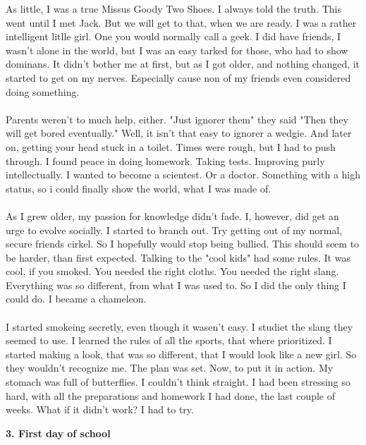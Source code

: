 \documentclass[]{article}
\begin{document}
As little, I was a true Missus Goody Two Shoes. I always told the truth. This went until I met Jack. But we will get to that, when we are ready. I was a rather intelligent litlle girl. One you would normally call a geek. I did have friends, I wasn't alone in the world, but I was an easy tarked for those, who had to show dominans. It didn't bother me at first, but as I got older, and nothing changed, it started to get on my nerves. Especially cause non of my friends even considered doing something.
\\ \\
Parents weren't to much help, either. "Just ignorer them" they said "Then they will get bored eventually." Well, it isn't that easy to ignorer a wedgie. And later on, getting your head stuck in a toilet. Times were rough, but I had to push through. I found peace in doing homework. Taking tests. Improving purly intellectually. I wanted to become a scientest. Or a doctor. Something with a high status, so i could finally show the world, what I was made of.
\\ \\
As I grew older, my passion for knowledge didn't fade. I, however, did get an urge to evolve socially. I started to branch out. Try getting out of my normal, secure friends cirkel. So I hopefully would stop being bullied. This should seem to be harder, than first expected. Talking to the "cool kids" had some rules. It was cool, if you smoked. You needed the right cloths. You needed the right slang. Everything was so different, from what I was used to. So I did the only thing I could do. I became a chameleon. 
\\ \\
I started smokeing secretly, even though it wasen't easy. I studiet the slang they seemed to use. I learned the rules of all the sports, that where prioritized. I started making a look, that was so different, that I would look like a new girl. So they wouldn't recognize me. The plan was set. Now, to put it in action. My stomach was full of butterflies. I couldn't think straight. I had been stressing so hard, with all the preparations and homework I had done, the last couple of weeks. What if it didn't work? I had to try.

\begin{center}
	\large\textbf{3. First day of school}
\end{center}
\end{document}
